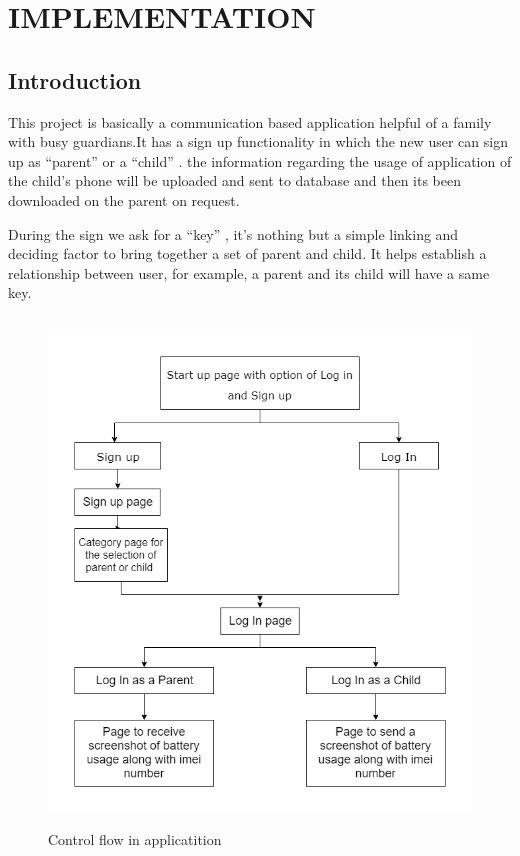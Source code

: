\newpage
\chapter{IMPLEMENTATION}
\section{Introduction}
This project is basically a communication based application helpful of a family with busy guardians.It has a sign up functionality in which the new user can  sign up as “parent” or a “child” . the information regarding the usage of application of the child's phone will be uploaded and sent to database and then its been downloaded on the parent on request.

During the sign we ask for a “key” , it's nothing but a simple linking and deciding factor to bring together a set of parent and child. It helps establish a relationship between user, for example, a parent and its child will have a same key.
\begin{figure}[!h]
\centering
\includegraphics[height=5.3in]{flow.PNG}
\caption{Control flow in applicatition}
\end{figure}
\newpage
